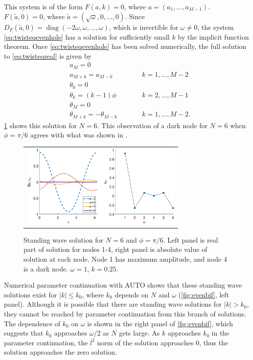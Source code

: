 \documentclass[reprint, amsmath,amssymb,aps]{revtex4-2}
\DeclareMathOperator{\diag}{diag}
\begin{document}
This system is of the form $F(a,k) = 0$, where $a = (a_1, \dots, a_{M-1})$. $F(\tilde{a}, 0) = 0$, where $\tilde{a} = (\sqrt{\omega}, 0, \dots, 0)$. Since $D_F(\tilde{a}, 0) = \diag(-2\omega,\omega, \dots, \omega)$, which is invertible for $\omega \neq 0$, the system \cref{eq:twisteqevenhole} has a solution for sufficiently small $k$ by the implicit function theorem. Once \cref{eq:twisteqevenhole} has been solved numerically, the full solution to \cref{eq:twisteqreal} is given by
\begin{align*}
&a_M = 0 \\
&a_{M+k} = a_{M-k} && \qquad k = 1, \dots, M-2 \\
&\theta_0 = 0 \\
&\theta_k = (k-1)\phi && \qquad  k = 2, \dots, M-1 \\
&\theta_M = 0 \\
&\theta_{M+k} = -\theta_{M-k} && \qquad k = 1, \dots, M-2.
\end{align*}
\cref{fig:evenhole6} shows this solution for $N=6$. This observation of a dark node for $N = 6$ when $\phi = \pi/6$ agrees with what was shown in \cite{castro2016}. 
\begin{figure}
\begin{center}
\begin{tabular}{c}
\includegraphics[width=8cm]{images/evenhole6.eps}
\end{tabular}
\end{center}
\caption{Standing wave solution for $N = 6$ and $\phi = \pi/6$. Left panel is real part of solution for nodes 1-4, right panel is absolute value of solution at each node. Node 1 has maximum amplitude, and node 4 is a dark node. $\omega = 1$, $k = 0.25$.}
\label{fig:evenhole6}
\end{figure}
Numerical parameter continuation with AUTO shows that these standing wave solutions exist for $|k| \leq k_0$, where $k_0$ depends on $N$ and $\omega$ (\cref{fig:evenbif}, left panel). Although it is possible that there are standing wave solutions for $|k| > k_0$, they cannot be reached by parameter continuation from this branch of solutions. The dependence of $k_0$ on $\omega$ is shown in the right panel of \cref{fig:evenbif}, which suggests that $k_0$ approaches $\omega/2$ as $N$ gets large. As $k$ approaches $k_0$ in the parameter continuation, the $l^2$ norm of the solution approaches 0, thus the solution approaches the zero solution. 
\end{document}

